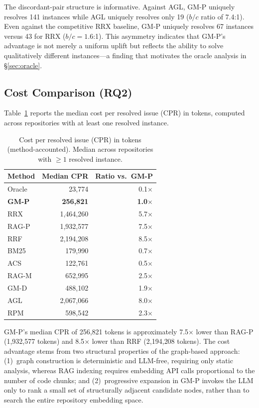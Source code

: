 The discordant-pair structure is informative. Against AGL, GM-P uniquely resolves 141 instances while AGL uniquely resolves only 19 ($b/c$ ratio of 7.4:1). Even against the competitive RRX baseline, GM-P uniquely resolves 67 instances versus 43 for RRX ($b/c = 1.6$:1). This asymmetry indicates that GM-P's advantage is not merely a uniform uplift but reflects the ability to solve qualitatively different instances---a finding that motivates the oracle analysis in \S\ref{sec:oracle}.

\subsection{Cost Comparison (RQ2)}

Table~\ref{tab:cost} reports the median cost per resolved issue (CPR) in tokens, computed across repositories with at least one resolved instance.

\begin{table}[t]
\centering
\caption{Cost per resolved issue (CPR) in tokens (method-accounted). Median across repositories with $\geq 1$ resolved instance.}
\label{tab:cost}
\small
\begin{tabular}{@{}lrr@{}}
\toprule
Method & Median CPR & Ratio vs.\ GM-P \\
\midrule
  Oracle & 23,774 & 0.1$\times$ \\
  \textbf{GM-P} & \textbf{256,821} & \textbf{1.0$\times$} \\
  RRX & 1,464,260 & 5.7$\times$ \\
  RAG-P & 1,932,577 & 7.5$\times$ \\
  RRF & 2,194,208 & 8.5$\times$ \\
  BM25 & 179,990 & 0.7$\times$ \\
  ACS & 122,761 & 0.5$\times$ \\
  RAG-M & 652,995 & 2.5$\times$ \\
  GM-D & 488,102 & 1.9$\times$ \\
  AGL & 2,067,066 & 8.0$\times$ \\
  RPM & 598,542 & 2.3$\times$ \\
\bottomrule
\end{tabular}
\end{table}

GM-P's median CPR of 256{,}821 tokens is approximately 7.5$\times$ lower than RAG-P (1{,}932{,}577 tokens) and 8.5$\times$ lower than RRF (2{,}194{,}208 tokens). The cost advantage stems from two structural properties of the graph-based approach: (1)~graph construction is deterministic and LLM-free, requiring only static analysis, whereas RAG indexing requires embedding API calls proportional to the number of code chunks; and (2)~progressive expansion in GM-P invokes the LLM only to rank a small set of structurally adjacent candidate nodes, rather than to search the entire repository embedding space.

